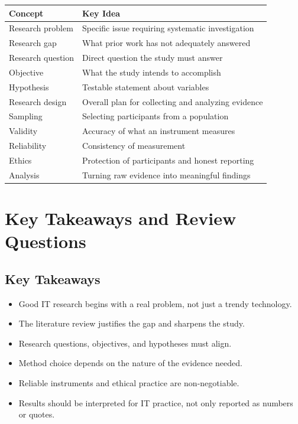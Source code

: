 \documentclass[11pt,a4paper]{article}
\begin{document}
\begin{longtable}{L{3.4cm}L{7.8cm}}
\toprule
\textbf{Concept} & \textbf{Key Idea} \\
\midrule
Research problem & Specific issue requiring systematic investigation \\
Research gap & What prior work has not adequately answered \\
Research question & Direct question the study must answer \\
Objective & What the study intends to accomplish \\
Hypothesis & Testable statement about variables \\
Research design & Overall plan for collecting and analyzing evidence \\
Sampling & Selecting participants from a population \\
Validity & Accuracy of what an instrument measures \\
Reliability & Consistency of measurement \\
Ethics & Protection of participants and honest reporting \\
Analysis & Turning raw evidence into meaningful findings \\
\bottomrule
\end{longtable}

\section{Key Takeaways and Review Questions}

\subsection{Key Takeaways}

\begin{itemize}[leftmargin=*]
  \item Good IT research begins with a real problem, not just a trendy technology.
  \item The literature review justifies the gap and sharpens the study.
  \item Research questions, objectives, and hypotheses must align.
  \item Method choice depends on the nature of the evidence needed.
  \item Reliable instruments and ethical practice are non-negotiable.
  \item Results should be interpreted for IT practice, not only reported as numbers or quotes.
\end{itemize}
\end{document}
